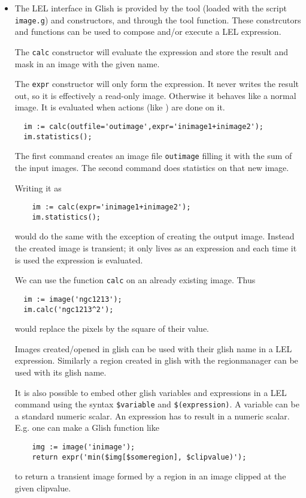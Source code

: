 \begin{itemize}
\item

The LEL interface in Glish is provided by the
 tool (loaded with the script
\texttt{image.g})  and
 constructors, and through
the  tool function. 
These constrcutors and functions can be used
to compose and/or execute a LEL expression.

\medskip\noindent The \texttt{calc} constructor will evaluate the expression and store
the result and mask in an image with the given name.

\medskip\noindent The \texttt{expr} constructor will only form the expression.  It never
writes the result out, so it is effectively a read-only image. 
Otherwise it behaves like a normal image.  It is evaluated when actions
(like ) are done on it. 

\begin{verbatim}
  im := calc(outfile='outimage',expr='inimage1+inimage2');
  im.statistics();
\end{verbatim}

\medskip\noindent The first command creates an image file \texttt{outimage} filling
it with the sum of the input images. The second command does
statistics on that new image.

\medskip\noindent Writing it as
\begin{verbatim}
    im := calc(expr='inimage1+inimage2');
    im.statistics();
\end{verbatim}
would do the same with the exception of creating the output image.
Instead the created image is transient; it only lives as an
expression and each time it is used the expression is evaluated.

\medskip\noindent We can use the function {\tt calc} on an already existing image.  Thus
\begin{verbatim}
  im := image('ngc1213');
  im.calc('ngc1213^2');
\end{verbatim}
would replace the pixels by the square of their value.

\medskip\noindent Images created/opened in glish can be used with their glish name
in a LEL expression. Similarly a region created in glish with the
regionmanager can be used with its glish name.

\medskip\noindent It is also possible to embed other glish variables and expressions in
a LEL command using the syntax \texttt{\$variable} and
\texttt{\$(expression)}. A variable can be a standard numeric scalar.
An expression has to result in a numeric scalar.
E.g. one can make a Glish function like
\begin{verbatim}
    img := image('inimage');
    return expr('min($img[$someregion], $clipvalue)');
\end{verbatim}
to return a transient image formed by a region in an image clipped at the
given clipvalue.


\end{itemize}
